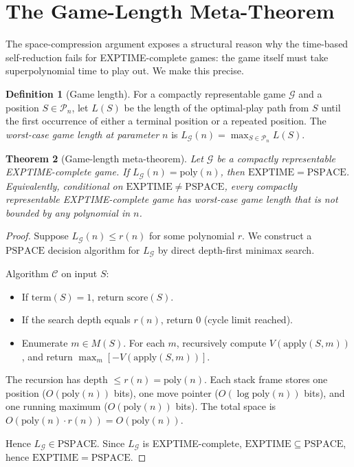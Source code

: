 \documentclass[11pt,a4paper]{amsart}
\theoremstyle{plain}
\newtheorem{theorem}{Theorem}[section]
\theoremstyle{definition}
\newtheorem{definition}[theorem]{Definition}
\theoremstyle{remark}
\newcommand{\EXPTIME}{\mathrm{EXPTIME}}
\newcommand{\PSPACE}{\mathrm{PSPACE}}
\newcommand{\Apply}{\mathrm{apply}}
\newcommand{\score}{\mathrm{score}}
\newcommand{\poly}{\mathrm{poly}}
\begin{document}
\section{The Game-Length Meta-Theorem}
\label{sec:length}

The space-compression argument exposes a structural reason why the
time-based self-reduction fails for EXPTIME-complete games: the game
itself must take superpolynomial time to play out. We make this
precise.

\begin{definition}[Game length]
\label{def:length}
For a compactly representable game $\mathcal{G}$ and a position $S \in
\mathcal{P}_n$, let $L(S)$ be the length of the optimal-play path
from $S$ until the first occurrence of either a terminal position or
a repeated position. The \emph{worst-case game length at parameter $n$}
is $L_\mathcal{G}(n) = \max_{S \in \mathcal{P}_n} L(S)$.
\end{definition}

\begin{theorem}[Game-length meta-theorem]
\label{thm:length}
Let $\mathcal{G}$ be a compactly representable EXPTIME-complete game.
If $L_\mathcal{G}(n) = \poly(n)$, then $\EXPTIME = \PSPACE$.
Equivalently, conditional on $\EXPTIME \neq \PSPACE$, every
compactly representable EXPTIME-complete game has worst-case game
length that is not bounded by any polynomial in $n$.
\end{theorem}

\begin{proof}
Suppose $L_\mathcal{G}(n) \leq r(n)$ for some polynomial $r$. We
construct a $\PSPACE$ decision algorithm for $L_\mathcal{G}$ by
direct depth-first minimax search.

Algorithm $\mathcal{C}$ on input $S$:
\begin{itemize}[nosep]
  \item If $\mathrm{term}(S) = 1$, return $\score(S)$.
  \item If the search depth equals $r(n)$, return $0$ (cycle limit
        reached).
  \item Enumerate $m \in M(S)$. For each $m$, recursively compute
        $V(\Apply(S, m))$, and return $\max_m [-V(\Apply(S, m))]$.
\end{itemize}

The recursion has depth $\leq r(n) = \poly(n)$. Each stack frame
stores one position ($O(\poly(n))$ bits), one move pointer
($O(\log \poly(n))$ bits), and one running maximum ($O(\poly(n))$
bits). The total space is $O(\poly(n) \cdot r(n)) = O(\poly(n))$.

Hence $L_\mathcal{G} \in \PSPACE$. Since $L_\mathcal{G}$ is
EXPTIME-complete, $\EXPTIME \subseteq \PSPACE$, hence
$\EXPTIME = \PSPACE$.
\end{proof}
\end{document}
